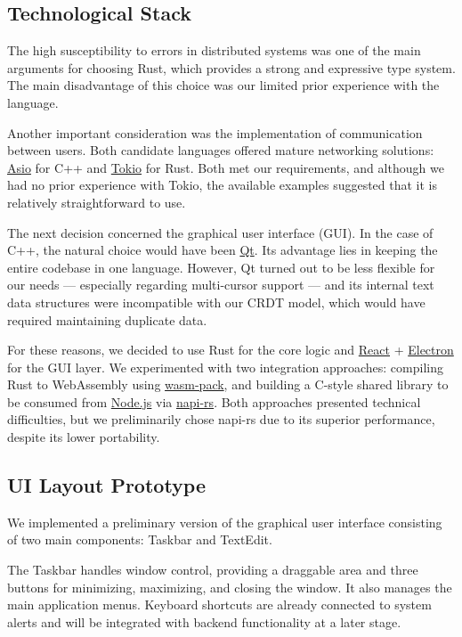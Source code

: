 \documentclass[12pt]{article}
\begin{document}
\subsection{Technological Stack}

The high susceptibility to errors in distributed systems was one of the main arguments for choosing Rust, which provides a strong and expressive type system. The main disadvantage of this choice was our limited prior experience with the language.

Another important consideration was the implementation of communication between users. Both candidate languages offered mature networking solutions: \href{https://think-async.com/Asio/}{Asio} for C++ and \href{https://tokio.rs/}{Tokio} for Rust. Both met our requirements, and although we had no prior experience with Tokio, the available examples suggested that it is relatively straightforward to use.

The next decision concerned the graphical user interface (GUI). In the case of C++, the natural choice would have been \href{https://www.qt.io}{Qt}. Its advantage lies in keeping the entire codebase in one language. However, Qt turned out to be less flexible for our needs — especially regarding multi-cursor support — and its internal text data structures were incompatible with our CRDT model, which would have required maintaining duplicate data.

For these reasons, we decided to use Rust for the core logic and \href{https://react.dev}{React} + \href{https://www.electronjs.org}{Electron} for the GUI layer. We experimented with two integration approaches: compiling Rust to WebAssembly using \href{https://github.com/drager/wasm-pack}{wasm-pack}, and building a C-style shared library to be consumed from \href{https://nodejs.org/en}{Node.js} via \href{https://napi.rs/}{napi-rs}. Both approaches presented technical difficulties, but we preliminarily chose napi-rs due to its superior performance, despite its lower portability.

\subsection{UI Layout Prototype}

We implemented a preliminary version of the graphical user interface consisting of two main components: Taskbar and TextEdit.

The Taskbar handles window control, providing a draggable area and three buttons for minimizing, maximizing, and closing the window. It also manages the main application menus. Keyboard shortcuts are already connected to system alerts and will be integrated with backend functionality at a later stage.
\end{document}

